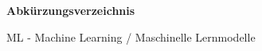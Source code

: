 
\newpage
\begin{center}
    \textbf{Abkürzungsverzeichnis}
\end{center}
ML - Machine Learning / Maschinelle Lernmodelle \newline

